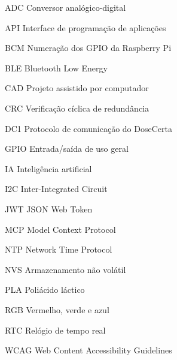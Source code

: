 \begin{siglas}
\item[ADC] Conversor analógico-digital
\item[API] Interface de programação de aplicações
\item[BCM] Numeração dos GPIO da Raspberry Pi
\item[BLE] Bluetooth Low Energy
\item[CAD] Projeto assistido por computador
\item[CRC] Verificação cíclica de redundância
\item[DC1] Protocolo de comunicação do DoseCerta
\item[GPIO] Entrada/saída de uso geral
\item[IA] Inteligência artificial
\item[I2C] Inter-Integrated Circuit
\item[JWT] JSON Web Token
\item[MCP] Model Context Protocol
\item[NTP] Network Time Protocol
\item[NVS] Armazenamento não volátil
\item[PLA] Poliácido láctico
\item[RGB] Vermelho, verde e azul
\item[RTC] Relógio de tempo real
\item[WCAG] Web Content Accessibility Guidelines
\end{siglas}
